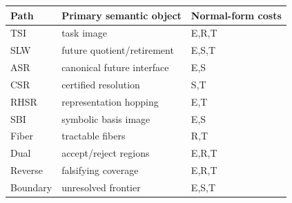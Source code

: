 \begin{tabular}{lll}
\toprule
Path & Primary semantic object & Normal-form costs \\
\midrule
TSI & task image & E,R,T \\
SLW & future quotient/retirement & E,S,T \\
ASR & canonical future interface & E,S \\
CSR & certified resolution & S,T \\
RHSR & representation hopping & E,T \\
SBI & symbolic basis image & E,S \\
Fiber & tractable fibers & R,T \\
Dual & accept/reject regions & E,R,T \\
Reverse & falsifying coverage & E,R,T \\
Boundary & unresolved frontier & E,S,T \\
\bottomrule
\end{tabular}